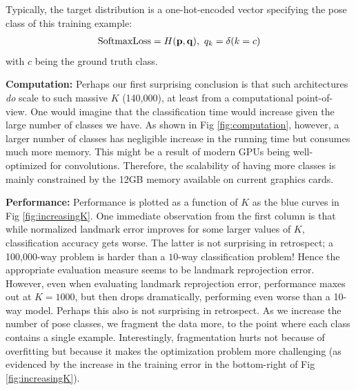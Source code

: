 \documentclass[letterpaper]{article} %
\begin{document}
Typically, the target distribution is a one-hot-encoded vector specifying the pose class of this training example:
\begin{align}
\label{eq:softmax}
\text{SoftmaxLoss} = H({\bf p}, {\bf q}), \ q_k =\delta(k = c)
\end{align}
with $c$ being the ground truth class.

{\bf Computation:} Perhaps our first surprising conclusion is that such architectures {\em do} scale to such massive $K$ (140,000), at least from a computational point-of-view. One would imagine that the classification time would increase given the large number of classes we have. As shown in Fig \ref{fig:computation}, however, a larger number of classes has negligible increase in the running time but consumes much more memory. This might be a result of modern GPUs being well-optimized for convolutions. Therefore, the scalability of having more classes is mainly constrained by the 12GB memory available on current graphics cards.

{\bf Performance:} Performance is plotted as a function of $K$ as the blue curves in Fig \ref{fig:increasingK}. One immediate observation from the first column is that while normalized landmark error improves for some larger values of $K$, classification accuracy gets worse. The latter is not surprising in retrospect; a 100,000-way problem is harder than a $10$-way classification problem! Hence the appropriate evaluation measure seems to be landmark reprojection error. However, even when evaluating landmark reprojection error, performance maxes out at $K=1000$, but then drops dramatically, performing even worse than a 10-way model. Perhaps this also is not surprising in retrospect. As we increase the number of pose classes, we fragment the data more, to the point where each class contains a single example. Interestingly, fragmentation hurts not because of overfitting but because it makes the optimization problem more challenging (as evidenced by the increase in the training error in the bottom-right of Fig \ref{fig:increasingK}).
\end{document}
